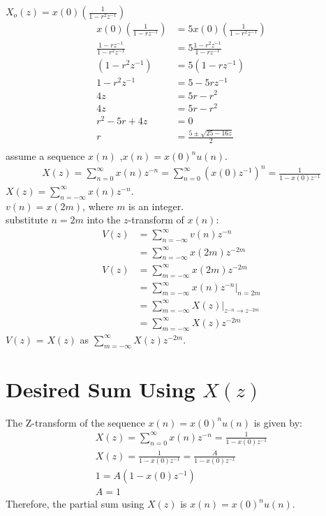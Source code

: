 \documentclass{article}
\begin{document}
$X_o(z)= x(0)\left(\frac{1}{1 - r^2z^{-1}}\right)$ \\
\begin{align}
x(0)\left(\frac{1}{1 - rz^{-1}}\right) &= 5 x(0)\left(\frac{1}{1 - r^2z^{-1}}\right) \\
\frac{1 - rz^{-1}}{1 - r^2z^{-1}} &= 5 \frac{1 - r^2z^{-1}}{1 - rz^{-1}} \\
(1 - r^2z^{-1}) &= 5 (1 - rz^{-1}) \\
1 - r^2z^{-1} &= 5 - 5rz^{-1} \\
4z &= 5r- r^2 \\
4z &= 5r- r^2 \\
r^2 - 5r + 4z &= 0 \\
r &= \frac{5\pm \sqrt{25- 16z}}{2}\\
\end{align}
assume a sequence \( x(n) \) ,\( x(n) =x(0)^n u(n) \).
\begin{align}
X(z) = \sum_{n=0}^{\infty} x(n)z^{-n} = \sum_{n=0}^{\infty} (x(0)z^{-1})^n = \frac{1}{1 - x(0)z^{-1}} 
\end{align}
\(X(z) = \sum_{n=-\infty}^{\infty} x(n)z^{-n}\).\\
\(v(n)=x(2m)\), where \(m\) is an integer.\\
substitute \(n=2m\) into the \(z\)-transform of \(x(n)\):
\begin{align}
V(z) & = \sum_{n=-\infty}^{\infty} v(n)z^{-n} \\
     & = \sum_{n=-\infty}^{\infty} x(2m)z^{-2m}\\
V(z) & = \sum_{m=-\infty}^{\infty} x(2m)z^{-2m} \\
     & = \sum_{m=-\infty}^{\infty} x(n)z^{-n} \Bigg|_{n=2m} \\
     & = \sum_{m=-\infty}^{\infty} X(z) \Bigg|_{z^{-n} \rightarrow z^{-2m}} \\
     & = \sum_{m=-\infty}^{\infty} X(z)z^{-2m}
\end{align}
\(V(z)\) = \(X(z)\) as \(\sum_{m=-\infty}^{\infty} X(z)z^{-2m}\).
\section*{Desired Sum Using $X(z)$}
The Z-transform of the sequence \( x(n) = x(0)^n u(n) \) is given by:
\begin{align}
X(z) = \sum_{n=0}^{\infty} x(n)z^{-n} = \frac{1}{1 - x(0)z^{-1}}\\
X(z) = \frac{1}{1 - x(0)z^{-1}} = \frac{A}{1 - x(0)z^{-1}}\\
1 = A(1 - x(0)z^{-1}) \\
A=1
\end{align}
Therefore, the partial sum using \(X(z)\) is \(x(n) = x(0)^n u(n)\).
\end{document}

